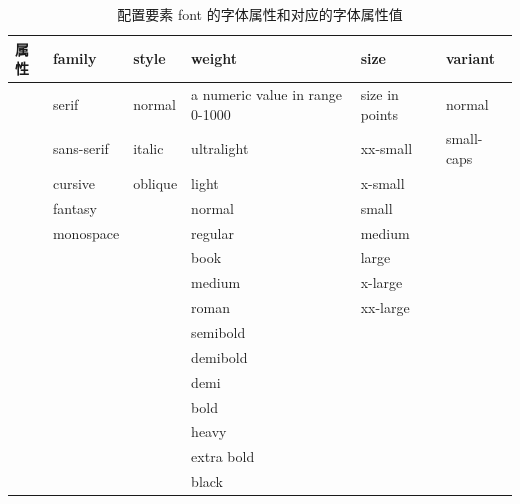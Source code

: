 \begin{table}
    \centering
    \caption{配置要素 font 的字体属性和对应的字体属性值}
    \begin{tabular}{l|l|l|l|l|l}
        \hline
        属性 & \textbf{family} & \textbf{style} & \textbf{weight}                 & \textbf{size}  & \textbf{variant} \\
        \hline
        ~  & serif           & normal         & a numeric value in range 0-1000 & size in points & normal           \\
        ~  & sans-serif      & italic         & ultralight                      & xx-small       & small-caps       \\
        ~  & cursive         & oblique        & light                           & x-small        & ~                \\
        ~  & fantasy         & ~              & normal                          & small          & ~                \\
        ~  & monospace       & ~              & regular                         & medium         & ~                \\
        ~  & ~               & ~              & book                            & large          & ~                \\
        ~  & ~               & ~              & medium                          & x-large        & ~                \\
        ~  & ~               & ~              & roman                           & xx-large       & ~                \\
        ~  & ~               & ~              & semibold                        & ~              & ~                \\
        ~  & ~               & ~              & demibold                        & ~              & ~                \\
        ~  & ~               & ~              & demi                            & ~              & ~                \\
        ~  & ~               & ~              & bold                            &                & ~                \\
        ~  & ~               & ~              & heavy                           &                & ~                \\
        ~  & ~               & ~              & extra bold                      &                & ~                \\
        ~  & ~               & ~              & black                           &                & ~                \\
        \hline
    \end{tabular}
\end{table}
